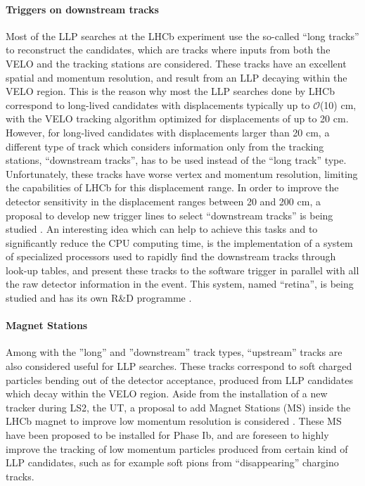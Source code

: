 \paragraph{Triggers on downstream tracks}
Most of the LLP searches at the LHCb experiment use the so-called ``long tracks'' to reconstruct the candidates, which are tracks where inputs from both the VELO and the tracking stations are considered. These tracks have an excellent spatial and momentum resolution, and result from an LLP decaying within the VELO region. This is the reason why most the LLP searches done by LHCb correspond to long-lived candidates with displacements typically up to $\mathcal{O}$(10) cm, with the VELO tracking algorithm optimized for displacements of up to 20 cm. However, for long-lived candidates with displacements larger than 20 cm, a different type of track which considers information only from the tracking stations, ``downstream tracks'', has to be used instead of the ``long track'' type. Unfortunately, these tracks have worse vertex and momentum resolution, limiting the capabilities of LHCb for this displacement range. In order to improve the detector sensitivity in the displacement ranges between 20 and 200 cm, a proposal to develop new trigger lines to select ``downstream tracks'' is being studied \cite{Aaij:2244312}. An interesting idea which can help to achieve this tasks and to significantly reduce the CPU computing time, is the implementation of a system of specialized processors used to  rapidly find the downstream tracks through look-up tables, and present these tracks to the software trigger in parallel with all the raw detector information in the event. This system, named ``retina'', is being studied and has its own R\&D programme \cite{Abba:2014iga}. 

\paragraph{Magnet Stations}
Among with the ''long'' and ''downstream'' track types, ``upstream'' tracks are also considered useful for LLP searches. These tracks correspond to soft charged particles bending out of the detector acceptance, produced from LLP candidates which decay within the VELO region. Aside from the installation of a new tracker during LS2, the UT, a proposal to add Magnet Stations (MS) inside the LHCb magnet to improve low momentum resolution is considered \cite{Aaij:2244311}. These MS have been proposed
to be installed for Phase Ib, and are foreseen to highly improve the tracking of low momentum particles produced from certain kind of LLP candidates, such as for example soft pions from ``disappearing'' chargino tracks.

